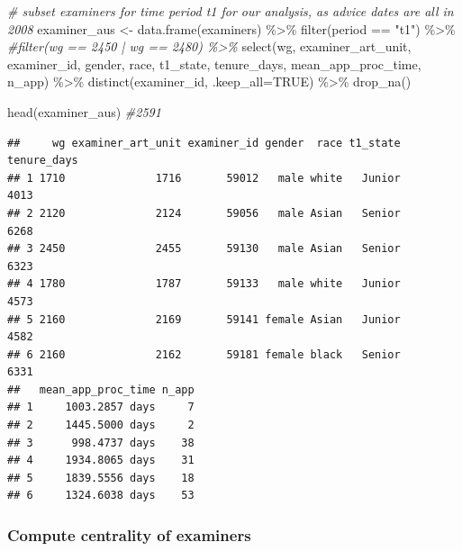 \documentclass[
]{article}
\newenvironment{Shaded}{\begin{snugshade}}{\end{snugshade}}
\newcommand{\AttributeTok}[1]{\textcolor[rgb]{0.77,0.63,0.00}{#1}}
\newcommand{\CommentTok}[1]{\textcolor[rgb]{0.56,0.35,0.01}{\textit{#1}}}
\newcommand{\ConstantTok}[1]{\textcolor[rgb]{0.00,0.00,0.00}{#1}}
\newcommand{\FunctionTok}[1]{\textcolor[rgb]{0.00,0.00,0.00}{#1}}
\newcommand{\NormalTok}[1]{#1}
\newcommand{\OtherTok}[1]{\textcolor[rgb]{0.56,0.35,0.01}{#1}}
\newcommand{\SpecialCharTok}[1]{\textcolor[rgb]{0.00,0.00,0.00}{#1}}
\newcommand{\StringTok}[1]{\textcolor[rgb]{0.31,0.60,0.02}{#1}}
\begin{document}
\begin{Shaded}
\begin{Highlighting}[]
\CommentTok{\# subset examiners for time period t1 for our analysis, as advice dates are all in 2008 }
\NormalTok{examiner\_aus }\OtherTok{\textless{}{-}} \FunctionTok{data.frame}\NormalTok{(examiners) }\SpecialCharTok{\%\textgreater{}\%}
    \FunctionTok{filter}\NormalTok{(period }\SpecialCharTok{==} \StringTok{"t1"}\NormalTok{) }\SpecialCharTok{\%\textgreater{}\%} 
    \CommentTok{\#filter(wg == 2450 | wg == 2480) \%\textgreater{}\%}
    \FunctionTok{select}\NormalTok{(wg, examiner\_art\_unit, examiner\_id, gender, race, t1\_state, tenure\_days, mean\_app\_proc\_time, n\_app) }\SpecialCharTok{\%\textgreater{}\%}
    \FunctionTok{distinct}\NormalTok{(examiner\_id, }\AttributeTok{.keep\_all=}\ConstantTok{TRUE}\NormalTok{) }\SpecialCharTok{\%\textgreater{}\%} 
    \FunctionTok{drop\_na}\NormalTok{() }

\FunctionTok{head}\NormalTok{(examiner\_aus) }\CommentTok{\#2591}
\end{Highlighting}
\end{Shaded}

\begin{verbatim}
##     wg examiner_art_unit examiner_id gender  race t1_state tenure_days
## 1 1710              1716       59012   male white   Junior        4013
## 2 2120              2124       59056   male Asian   Senior        6268
## 3 2450              2455       59130   male Asian   Senior        6323
## 4 1780              1787       59133   male white   Junior        4573
## 5 2160              2169       59141 female Asian   Junior        4582
## 6 2160              2162       59181 female black   Senior        6331
##   mean_app_proc_time n_app
## 1     1003.2857 days     7
## 2     1445.5000 days     2
## 3      998.4737 days    38
## 4     1934.8065 days    31
## 5     1839.5556 days    18
## 6     1324.6038 days    53
\end{verbatim}

\hypertarget{compute-centrality-of-examiners}{%
\subsubsection{Compute centrality of
examiners}\label{compute-centrality-of-examiners}}
\end{document}
